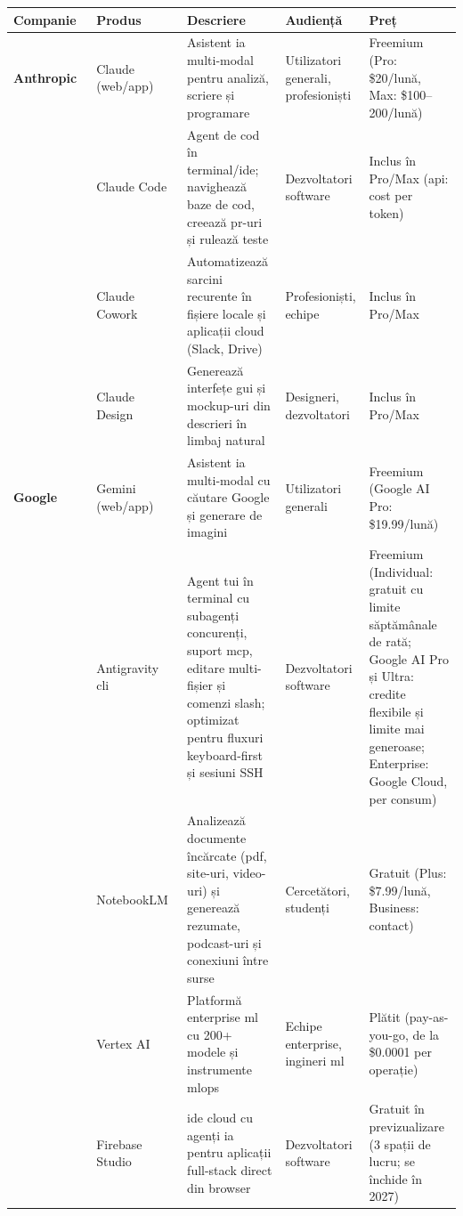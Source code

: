 \documentclass[12pt, a4paper, oneside, romanian]{teza-upb}
\begin{document}
  \begin{table}[H]
  \centering
  \scriptsize
    \begin{tabularx}{\textwidth}{|>{\hsize=0.55\hsize\RaggedRight}X|>{\hsize=0.55\hsize\RaggedRight}X|>{\hsize=1.3\hsize\RaggedRight}X|>{\hsize=0.4\hsize\RaggedRight}X|>{\hsize=1.2\hsize\RaggedRight}X|}
      \hline
      \textbf{Companie} & \textbf{Produs} & \textbf{Descriere} & \textbf{Audiență} & \textbf{Preț} \\
      \hline

      \textbf{Anthropic~\cite{web_anthropic}} & Claude~\cite{web_claude_app} (web/app) & Asistent \ac{ia} multi-modal pentru analiză, scriere și programare & Utilizatori generali, profesioniști & Freemium (Pro: \$20/lună, Max: \$100--200/lună) \\
      \hline
      & Claude Code~\cite{api_claude_code} & Agent de cod în terminal/\ac{ide}; navighează baze de cod, creează \ac{pr}-uri și rulează teste & Dezvoltatori software & Inclus în Pro/Max (\ac{api}: cost per token) \\
      \hline
      & Claude Cowork & Automatizează sarcini recurente în fișiere locale și aplicații cloud (Slack, Drive) & Profesioniști, echipe & Inclus în Pro/Max \\
      \hline
      & Claude Design & Generează interfețe \ac{gui} și mockup-uri din descrieri în limbaj natural & Designeri, dezvoltatori & Inclus în Pro/Max \\
      \hline

      \textbf{Google~\cite{web_google}} & Gemini~\cite{web_gemini_app} (web/app) & Asistent \ac{ia} multi-modal cu căutare Google și generare de imagini & Utilizatori generali & Freemium (Google AI Pro: \$19.99/lună) \\
      \hline
      & Antigravity \ac{cli}~\cite{gh_antigravity_cli} & Agent \ac{tui} în terminal cu subagenți concurenți, suport \ac{mcp}, editare multi-fișier și comenzi slash; optimizat pentru fluxuri keyboard-first și sesiuni SSH & Dezvoltatori software & Freemium (Individual: gratuit cu limite săptămânale de rată; Google AI Pro și Ultra: credite flexibile și limite mai generoase; Enterprise: Google Cloud, per consum) \\
      \hline
      & NotebookLM~\cite{web_notebooklm} & Analizează documente încărcate (\ac{pdf}, site-uri, video-uri) și generează rezumate, podcast-uri și conexiuni între surse & Cercetători, studenți & Gratuit (Plus: \$7.99/lună, Business: contact) \\
      \hline
      & Vertex AI~\cite{web_vertex_ai} & Platformă enterprise \ac{ml} cu 200+ modele și instrumente \ac{mlops} & Echipe enterprise, ingineri \ac{ml} & Plătit (pay-as-you-go, de la \$0.0001 per operație) \\
      \hline
      & Firebase Studio~\cite{web_firebase_studio} & \ac{ide} cloud cu agenți \ac{ia} pentru aplicații full-stack direct din browser & Dezvoltatori software & Gratuit în previzualizare (3 spații de lucru; se închide în 2027) \\
      \hline


\end{tabularx}
\end{table}
\end{document}
